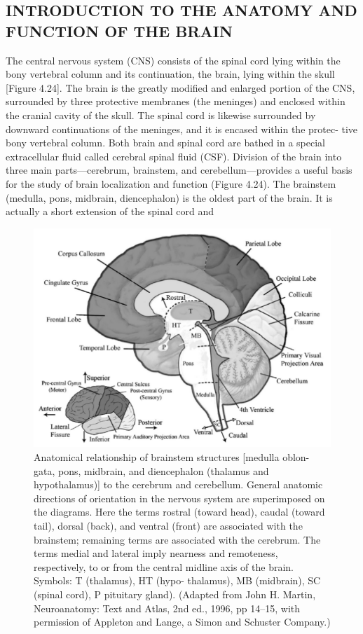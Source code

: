 \subsection{INTRODUCTION TO THE ANATOMY AND FUNCTION OF THE BRAIN}

The central nervous system (CNS) consists of the spinal cord lying within the
bony vertebral column and its continuation, the brain, lying within the skull
[Figure 4.24]. The brain is the greatly modified and enlarged portion of the
CNS, surrounded by three protective membranes (the meninges) and enclosed
within the cranial cavity of the skull. The spinal cord is likewise surrounded by
downward continuations of the meninges, and it is encased within the protec-
tive bony vertebral column. Both brain and spinal cord are bathed in a special
extracellular fluid called cerebral spinal fluid (CSF).
Division of the brain into three main parts—cerebrum, brainstem, and
cerebellum—provides a useful basis for the study of brain localization and
function (Figure 4.24). The brainstem (medulla, pons, midbrain, diencephalon)
is the oldest part of the brain. It is actually a short extension of the spinal cord and

\begin{figure}
\centering
\includegraphics[width=0.7\linewidth]{figura_1.png} 
\caption{Anatomical relationship of brainstem structures [medulla oblon-
gata, pons, midbrain, and diencephalon (thalamus and hypothalamus)] to the
cerebrum and cerebellum. General anatomic directions of orientation in the
nervous system are superimposed on the diagrams. Here the terms rostral
(toward head), caudal (toward tail), dorsal (back), and ventral (front) are
associated with the brainstem; remaining terms are associated with the cerebrum.
The terms medial and lateral imply nearness and remoteness, respectively, to or
from the central midline axis of the brain. Symbols: T (thalamus), HT (hypo-
thalamus), MB (midbrain), SC (spinal cord), P pituitary gland). (Adapted from
John H. Martin, Neuroanatomy: Text and Atlas, 2nd ed., 1996, pp 14–15, with
permission of Appleton and Lange, a Simon and Schuster Company.)}
\end{figure}

